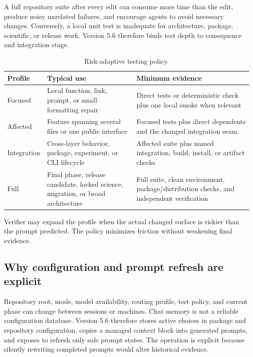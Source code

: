 \documentclass[11pt,a4paper]{article}
\newcommand{\code}[1]{\texttt{\detokenize{#1}}}
\begin{document}
A full repository suite after every edit can consume more time than the edit, produce noisy unrelated failures, and encourage agents to avoid necessary changes. Conversely, a local unit test is inadequate for architecture, package, scientific, or release work. Version 5.6 therefore binds test depth to consequence and integration stage.

\begin{table}[H]
\centering
\caption{Risk-adaptive testing policy.}
\begin{tabularx}{\textwidth}{P{0.18\textwidth}P{0.23\textwidth}Y}
\toprule
\textbf{Profile} & \textbf{Typical use} & \textbf{Minimum evidence} \\
\midrule
Focused & Local function, link, prompt, or small formatting repair & Direct tests or deterministic check plus one local smoke when relevant \\
Affected & Feature spanning several files or one public interface & Focused tests plus direct dependents and the changed integration seam \\
Integration & Cross-layer behavior, package, experiment, or CLI lifecycle & Affected suite plus named integration, build, install, or artifact checks \\
Full & Final phase, release candidate, locked science, migration, or broad architecture & Full suite, clean environment, package/distribution checks, and independent verification \\
\bottomrule
\end{tabularx}
\end{table}

Verifier may expand the profile when the actual changed surface is riskier than the prompt predicted. The policy minimizes friction without weakening final evidence.

\subsection{Why configuration and prompt refresh are explicit}

Repository root, mode, model availability, routing profile, test policy, and current phase can change between sessions or machines. Chat memory is not a reliable configuration database. Version 5.6 therefore stores active choices in package and repository configuration, copies a managed context block into generated prompts, and exposes \code{aw update} to refresh only safe prompt states. The operation is explicit because silently rewriting completed prompts would alter historical evidence.
\end{document}
